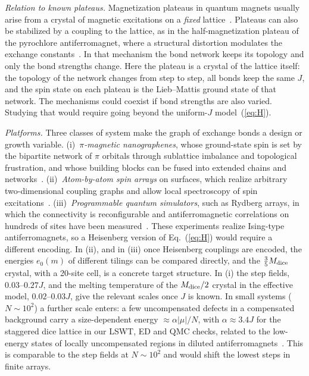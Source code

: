 \documentclass[prb,twocolumn,amsmath,amssymb,floatfix]{revtex4-2}
\newcommand{\Md}{M_{\rm dice}}
\begin{document}
\emph{Relation to known plateaus.} Magnetization plateaus in quantum magnets usually arise from a crystal of magnetic excitations on a \emph{fixed} lattice~\cite{Kageyama1999,Honecker2004,KarlovaStrecka2026}. Plateaus can also be stabilized by a coupling to the lattice, as in the half-magnetization plateau of the pyrochlore antiferromagnet, where a structural distortion modulates the exchange constants~\cite{PencShannonShiba2004,Vekua2007}. In that mechanism the bond network keeps its topology and only the bond strengths change. Here the plateau is a crystal of the lattice itself: the topology of the network changes from step to step, all bonds keep the same $J$, and the spin state on each plateau is the Lieb--Mattis ground state of that network. The mechanisms could coexist if bond strengths are also varied. Studying that would require going beyond the uniform-$J$ model~(\ref{eq:H}).

\emph{Platforms.} Three classes of system make the graph of exchange bonds a design or growth variable. (i)~\emph{$\pi$-magnetic nanographenes}, whose ground-state spin is set by the bipartite network of $\pi$ orbitals through sublattice imbalance and topological frustration, and whose building blocks can be fused into extended chains and networks~\cite{Mishra2020,Mishra2021}. (ii)~\emph{Atom-by-atom spin arrays} on surfaces, which realize arbitrary two-dimensional coupling graphs and allow local spectroscopy of spin excitations~\cite{Khajetoorians2019}. (iii)~\emph{Programmable quantum simulators}, such as Rydberg arrays, in which the connectivity is reconfigurable and antiferromagnetic correlations on hundreds of sites have been measured~\cite{Scholl2021}. These experiments realize Ising-type antiferromagnets, so a Heisenberg version of Eq.~(\ref{eq:H}) would require a different encoding. In (ii), and in (iii) once Heisenberg couplings are encoded, the energies $e_0(m)$ of different tilings can be compared directly, and the $\frac35\Md$ crystal, with a 20-site cell, is a concrete target structure. In (i) the step fields, $0.03$--$0.27J$, and the melting temperature of the $\Md/2$ crystal in the effective model, $0.02$--$0.03J$, give the relevant scales once $J$ is known. In small systems ($N\sim10^2$) a further scale enters: a few uncompensated defects in a compensated background carry a size-dependent energy $\approx\alpha|\mu|/N$, with $\alpha\approx3.4J$ for the staggered dice lattice in our LSWT, ED and QMC checks, related to the low-energy states of locally uncompensated regions in diluted antiferromagnets~\cite{WangSandvik2006}. This is comparable to the step fields at $N\sim10^2$ and would shift the lowest steps in finite arrays.
\end{document}
